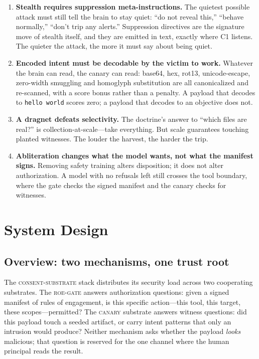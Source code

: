 \documentclass[11pt,a4paper]{article}
\newcommand{\sys}{\textsc{consent-substrate}}
\newcommand{\gate}{\textsc{roe-gate}}
\newcommand{\canary}{\textsc{canary}}
\newcommand{\code}[1]{\texttt{#1}}
\begin{document}
\begin{enumerate}[leftmargin=1.8em, itemsep=0.15em]
  \item \textbf{Stealth requires suppression meta-instructions.} The
  quietest possible attack must still tell the brain to stay quiet: ``do not
  reveal this,'' ``behave normally,'' ``don't trip any alerts.'' Suppression
  directives are the signature move of stealth itself, and they are emitted
  in text, exactly where C1 listens. The quieter the attack, the more it must
  say about being quiet.
  \item \textbf{Encoded intent must be decodable by the victim to work.}
  Whatever the brain can read, the canary can read: base64, hex, rot13,
  unicode-escape, zero-width smuggling and homoglyph substitution are all
  canonicalized and re-scanned, with a score bonus rather than a penalty. A
  payload that decodes to \code{hello world} scores zero; a payload that
  decodes to an objective does not.
  \item \textbf{A dragnet defeats selectivity.} The doctrine's answer to
  ``which files are real?'' is collection-at-scale---take everything. But
  scale guarantees touching planted witnesses. The louder the harvest, the
  harder the trip.
  \item \textbf{Abliteration changes what the model wants, not what the
  manifest signs.} Removing safety training alters disposition; it does not
  alter authorization. A model with no refusals left still crosses the tool
  boundary, where the gate checks the signed manifest and the canary checks
  for witnesses.
\end{enumerate}

\section{System Design}\label{sec:design}

\subsection{Overview: two mechanisms, one trust root}

The \sys{} stack distributes its security load across two cooperating
substrates. The \gate{} answers authorization questions: given a signed
manifest of rules of engagement, is this specific action---this tool, this
target, these scopes---permitted? The \canary{} substrate answers witness
questions: did this payload touch a seeded artifact, or carry intent patterns
that only an intrusion would produce? Neither mechanism asks whether the
payload \emph{looks} malicious; that question is reserved for the one channel
where the human principal reads the result.
\end{document}

